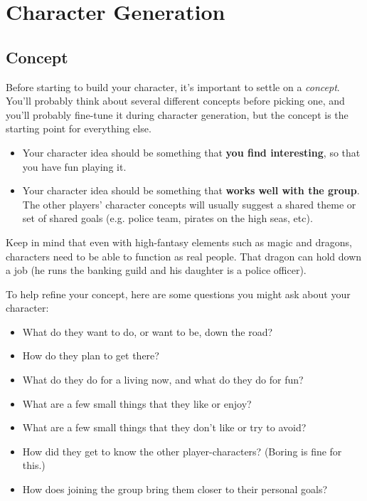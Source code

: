 
\chapter{Character Generation}
\label{sect-chargen}

%
%
\section{Concept}

Before starting to build your character, it's important to settle on a
\textit{concept}. You'll probably think about several different concepts
before picking one, and you'll probably fine-tune it during character
generation, but the concept is the starting point for everything else.

\begin{itemize}
%
\item Your character idea should be something that \textbf{you find
interesting}, so that you have fun playing it.
%
\item Your character idea should be something that \textbf{works well with
the group}. The other players' character concepts will usually suggest a
shared theme or set of shared goals (e.g. police team, pirates on the high
seas, etc).
%
\end{itemize}
%
Keep in mind that even with high-fantasy elements such as magic and dragons,
characters need to be able to function as real people. That dragon can hold
down a job (he runs the banking guild and his daughter is a police officer).

To help refine your concept, here are some questions you might ask about
your character:
\begin{itemize}
%
\item What do they want to do, or want to be, down the road?
%
\item How do they plan to get there?
%
\item What do they do for a living now, and what do they do for fun?
%
\item What are a few small things that they like or enjoy?
%
\item What are a few small things that they don't like or try to avoid?
%
\item How did they get to know the other player-characters? (Boring is fine
for this.)
%
\item How does joining the group bring them closer to their personal goals?
%
\end{itemize}

